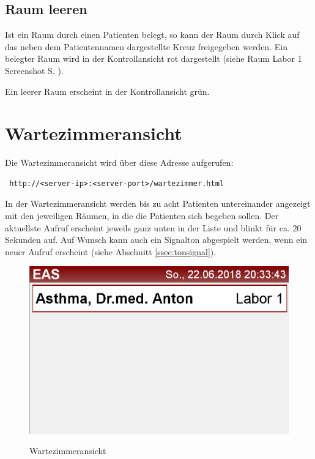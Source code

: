\documentclass[a4paper,10pt]{scrreprt}
\begin{document}
\section{Raum leeren}
Ist ein Raum durch einen Patienten belegt, so kann der Raum durch Klick auf das neben dem Patientennamen dargestellte Kreuz freigegeben werden. Ein belegter Raum wird in der Kontrollansicht rot dargestellt (siehe Raum \glqq{}Labor 1\grqq{} Screenshot S. \pageref{controlinterface}).

Ein leerer Raum erscheint in der Kontrollansicht grün.

\chapter{Wartezimmeransicht}
Die Wartezimmeransicht wird über diese Adresse aufgerufen:
\begin{lstlisting}
 http://<server-ip>:<server-port>/wartezimmer.html
\end{lstlisting}

In der Wartezimmeransicht werden bis zu acht Patienten untereinander angezeigt mit den jeweiligen Räumen, in die die Patienten sich begeben sollen. Der aktuellste Aufruf erscheint jeweils ganz unten in der Liste und blinkt für ca. 20 Sekunden auf. Auf Wunsch kann auch ein Signalton abgespielt werden,
wenn ein neuer Aufruf erscheint (siehe Abschnitt \ref{ssec:tonsignal}).

\begin{figure}[h]
 \centering
 \includegraphics[width=\textwidth]{./Screenshot-Wartezimmer.png}
 \label{controlinterface}
 \caption{Wartezimmeransicht}
\end{figure}
\end{document}
